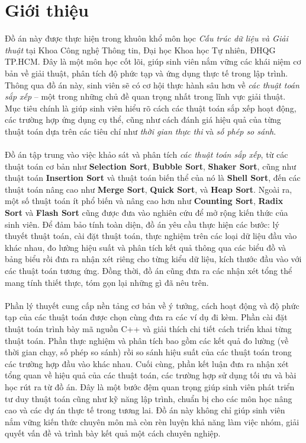 \section{Giới thiệu}

Đồ án này được thực hiện trong khuôn khổ môn học \textit{Cấu trúc dữ liệu 
và Giải thuật} tại Khoa Công nghệ Thông tin, Đại học Khoa học Tự nhiên, 
ĐHQG TP.HCM. Đây là một môn học cốt lõi, giúp sinh viên nắm vững các 
khái niệm cơ bản về giải thuật, phân tích độ phức tạp và ứng dụng 
thực tế trong lập trình. Thông qua đồ án này, sinh viên sẽ có cơ hội 
thực hành sâu hơn về \textit{các thuật toán sắp xếp} – một trong những chủ đề 
quan trọng nhất trong lĩnh vực giải thuật. Mục tiêu chính là giúp 
sinh viên hiểu rõ cách các thuật toán sắp xếp hoạt động, các trường hợp 
ứng dụng cụ thể, cũng như cách đánh giá hiệu quả của từng thuật toán 
dựa trên các tiêu chí như \textit{thời gian thực thi} và \textit{số phép so sánh}.
\\\\
Đồ án tập trung vào việc khảo sát và phân tích \textit{các thuật toán sắp 
xếp}, từ các thuật toán cơ bản như \textbf{Selection Sort}, \textbf{Bubble 
Sort}, \textbf{Shaker Sort}, cũng như thuật toán \textbf{Insertion Sort} 
và thuật toán biến thể của nó là \textbf{Shell Sort}, đến các thuật toán 
nâng cao như \textbf{Merge Sort}, \textbf{Quick Sort}, và \textbf{Heap 
Sort}. Ngoài ra, một số thuật toán ít phổ biến và nâng cao hơn như 
\textbf{Counting Sort}, \textbf{Radix Sort} và \textbf{Flash Sort} cũng 
được đưa vào nghiên cứu để mở rộng kiến thức của sinh viên. Để đảm bảo 
tính toàn diện, đồ án yêu cầu thực hiện các bước: lý thuyết thuật toán, 
cài đặt thuật toán, thực nghiệm trên các loại dữ liệu đầu vào khác nhau, 
đo lường hiệu suất và phân tích kết quả thông qua các biểu đồ và bảng 
biểu rồi đưa ra nhận xét riêng cho từng kiểu dữ liệu, kích thước đầu vào 
với các thuật toán tương ứng. Đồng thời, đồ án cũng đưa ra các nhận xét 
tổng thể mang tính thiết thực, tóm gọn lại những gì đã nêu trên.
\\\\
Phần lý thuyết cung cấp nền tảng cơ bản về ý tưởng, cách hoạt động và độ 
phức tạp của các thuật toán được chọn cùng đưa ra các ví dụ đi kèm. Phần 
cài đặt thuật toán trình bày mã nguồn C++ và giải thích chi tiết cách 
triển khai từng thuật toán. Phần thực nghiệm và phân tích bao gồm các 
kết quả đo lường (về thời gian chạy, số phép so sánh) rồi so sánh hiệu 
suất của các thuật toán trong các trường hợp đầu vào khác nhau. Cuối cùng, 
phần kết luận đưa ra nhận xét tổng quan về hiệu quả của các thuật toán, 
các trường hợp sử dụng tối ưu và bài học rút ra từ đồ án. Đây là một bước 
đệm quan trọng giúp sinh viên phát triển tư duy thuật toán cũng như kỹ 
năng lập trình, chuẩn bị cho các môn học nâng cao và các dự án thực tế 
trong tương lai. Đồ án này không chỉ giúp sinh viên nắm vững kiến thức 
chuyên môn mà còn rèn luyện khả năng làm việc nhóm, giải quyết vấn đề và 
trình bày kết quả một cách chuyên nghiệp. 